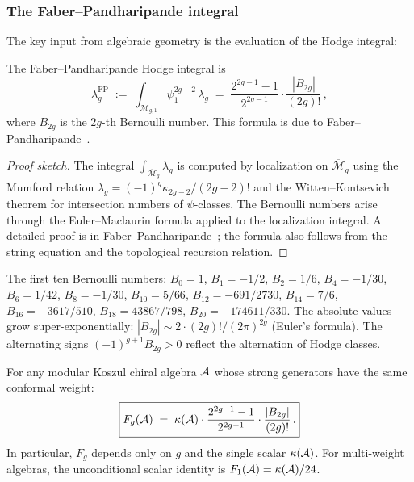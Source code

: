 \subsubsection{The Faber--Pandharipande integral}

The key input from algebraic geometry is the evaluation of the Hodge integral:

\begin{proposition}
\label{prop:thqg-I-faber-pandharipande}
The Faber--Pandharipande Hodge integral is
\begin{equation}\label{eq:thqg-I-fp-integral}
\lambda_g^{\mathrm{FP}} \;:=\;
\int_{\overline{\mathcal{M}}_{g,1}} \psi_1^{2g-2}\,\lambda_g
\;=\; \frac{2^{2g-1} - 1}{2^{2g-1}} \cdot \frac{|B_{2g}|}{(2g)!}\,,
\end{equation}
where $B_{2g}$ is the $2g$-th Bernoulli number. This formula is due to Faber--Pandharipande~\cite{FP03}.
\end{proposition}

\begin{proof}[Proof sketch]
The integral $\int_{\overline{\mathcal{M}}_g} \lambda_g$ is computed by localization on $\overline{\mathcal{M}}_g$ using the Mumford relation $\lambda_g = (-1)^g \kappa_{2g-2}/(2g-2)!$ and the Witten--Kontsevich theorem for intersection numbers of $\psi$-classes. The Bernoulli numbers arise through the Euler--Maclaurin formula applied to the localization integral. A detailed proof is in Faber--Pandharipande~\cite{FP03}; the formula also follows from the string equation and the topological recursion relation.
\end{proof}

\begin{remark}
\label{rem:thqg-I-bernoulli}
The first ten Bernoulli numbers: $B_0 = 1$, $B_1 = -1/2$, $B_2 = 1/6$, $B_4 = -1/30$, $B_6 = 1/42$, $B_8 = -1/30$, $B_{10} = 5/66$, $B_{12} = -691/2730$, $B_{14} = 7/6$, $B_{16} = -3617/510$, $B_{18} = 43867/798$, $B_{20} = -174611/330$. The absolute values grow super-exponentially: $|B_{2g}| \sim 2 \cdot (2g)! / (2\pi)^{2g}$ (Euler's formula). The alternating signs $(-1)^{g+1} B_{2g} > 0$ reflect the alternation of Hodge classes.
\end{remark}

\begin{proposition}
\label{prop:thqg-I-Fg-closed-form}
For any modular Koszul chiral algebra $\mathcal{A}$ whose strong generators
have the same conformal weight:
\begin{equation}\label{eq:thqg-I-Fg-formula}
\boxed{ F_g(\mathcal{A}) \;=\; \kappa(\mathcal{A}) \cdot \frac{2^{2g-1}-1}{2^{2g-1}} \cdot \frac{|B_{2g}|}{(2g)!}\,. }
\end{equation}
In particular, $F_g$ depends only on $g$
and the single scalar $\kappa(\mathcal{A})$.
For multi-weight algebras, the unconditional scalar identity is
$F_1(\mathcal{A}) = \kappa(\mathcal{A})/24$.
\end{proposition}

